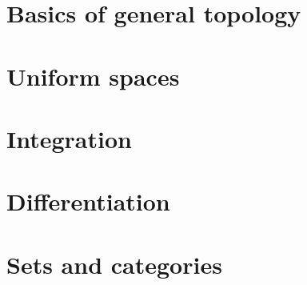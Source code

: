 \documentclass[11pt,fleqn]{book} %
\begin{document}



\chapter{Basics of general topology}




\chapter{Uniform spaces}\label{chp5}




\chapter{Integration}\label{chp5xx}




\chapter{Differentiation}\label{chp5x}




\appendix

\chapter{Sets and categories}








\cleardoublepage
{}
\setlength{\columnsep}{0.75cm}
\printindex
\printindex[notation]

\end{document}
